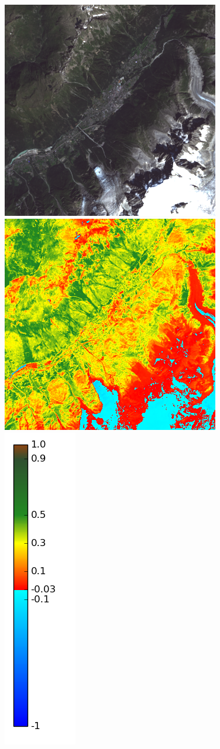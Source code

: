 \documentclass{book}
\begin{document}
\begin{figure}[H]
\centerline{
\includegraphics[scale=0.45]{../3_ndvi/images/Chamonix/08_rgb.png}
\includegraphics[scale=0.45]{../3_ndvi/images/Chamonix/08_ndvi.png}
\includegraphics[scale=0.4]{../3_ndvi/images/colormap.png}
}
\end{figure}
\end{document}
